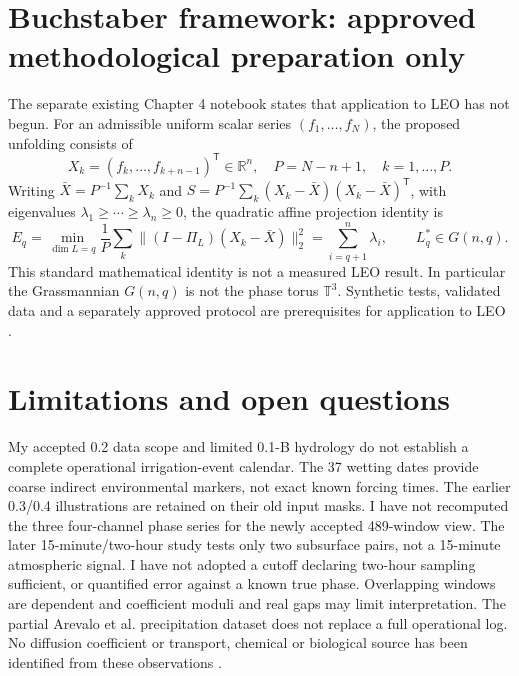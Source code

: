 \documentclass[11pt,letterpaper]{article}
\begin{document}
\section{Buchstaber framework: approved methodological preparation only}
\label{sec:buchstaber}
The separate existing Chapter 4 notebook states that application to LEO has not begun. For an admissible uniform scalar series $(f_1,\ldots,f_N)$, the proposed unfolding consists of
\begin{equation}
X_k=(f_k,\ldots,f_{k+n-1})^\mathsf{T}\in\mathbb R^n,\quad
P=N-n+1,\quad k=1,\ldots,P.
\end{equation}
Writing $\bar X=P^{-1}\sum_kX_k$ and $S=P^{-1}\sum_k(X_k-\bar X)(X_k-\bar X)^\mathsf T$, with eigenvalues $\lambda_1\geq\cdots\geq\lambda_n\geq0$, the quadratic affine projection identity is
\begin{equation}
E_q=\min_{\dim L=q}\frac1P\sum_k\|(I-\Pi_L)(X_k-\bar X)\|_2^2
=\sum_{i=q+1}^n\lambda_i,\qquad L_q^*\in G(n,q).
\end{equation}
This standard mathematical identity is not a measured LEO result. In particular the Grassmannian $G(n,q)$ is not the phase torus $\mathbb T^3$. Synthetic tests, validated data and a separately approved protocol are prerequisites for application to LEO \cite{buchnotebook,buch1994,buch2025}.

\section{Limitations and open questions}
\label{sec:limits}
My accepted 0.2 data scope and limited 0.1-B
hydrology do not establish a complete operational
irrigation-event calendar. The 37 wetting dates
provide coarse indirect environmental markers,
not exact known forcing times. The earlier 0.3/0.4
illustrations are retained on their old input masks.
I have not recomputed the three four-channel phase
series for the newly accepted 489-window view.
The later 15-minute/two-hour study tests only two
subsurface pairs, not a 15-minute atmospheric
signal. I have not adopted a cutoff declaring
two-hour sampling sufficient, or quantified error
against a known true phase. Overlapping windows
are dependent and coefficient moduli and real gaps
may limit interpretation. The partial Arevalo et al.
precipitation dataset does not replace a full
operational log. No diffusion coefficient or
transport, chemical or biological source has
been identified from these observations
\cite{plan,hydroaudit,gridpassport}.
\end{document}
